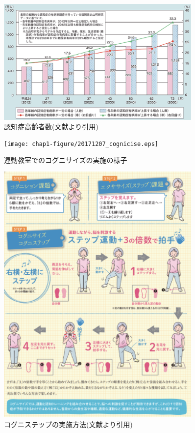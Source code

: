 \begin{figure}[tbp]
	\centering
			\includegraphics[width=0.9\textwidth]{chap1-figure/dementia_senior_number.eps}
	\caption{認知症高齢者数(文献\cite{高齢社会白書}より引用)}
	\label{fig:dementia_senior_number}
\end{figure}

\begin{figure}[tbp]
	\centering
			\texttt{[image: chap1-figure/20171207\_cognicise.eps]}
	\caption{運動教室でのコグニサイズの実施の様子}
	\label{fig:20171207_cognicise}
\end{figure}

\begin{figure}[tbp]
	\centering
			\includegraphics[width=0.9\textwidth]{chap1-figure/cognistep.eps}
	\caption{コグニステップの実施方法(文献\cite{認知症予防へ向けた運動コグニサイズ}より引用)}
	\label{fig:cognistep}
\end{figure}



